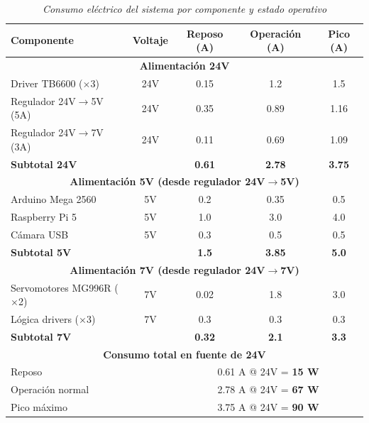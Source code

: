 \begin{table}[H]
\centering
\small
\begin{tabular}{|l|c|c|c|c|}
\hline
\textbf{Componente} & \textbf{Voltaje} & \textbf{Reposo (A)} & \textbf{Operación (A)} & \textbf{Pico (A)} \\
\hline
\multicolumn{5}{|c|}{\textbf{Alimentación 24V}} \\
\hline
Driver TB6600 ($\times$3) & 24V & 0.15 & 1.2 & 1.5 \\
\hline
Regulador 24V$\rightarrow$5V (5A)& 24V & 0.35 & 0.89 & 1.16 \\
\hline
Regulador 24V$\rightarrow$7V (3A)& 24V & 0.11 & 0.69 & 1.09 \\
\hline
\multicolumn{2}{|l|}{\textbf{Subtotal 24V}} & \textbf{0.61} & \textbf{2.78} & \textbf{3.75} \\
\hline
\hline
\multicolumn{5}{|c|}{\textbf{Alimentación 5V (desde regulador 24V$\rightarrow$5V)}} \\
\hline
Arduino Mega 2560 & 5V & 0.2 & 0.35 & 0.5 \\
\hline
Raspberry Pi 5 & 5V & 1.0 & 3.0 & 4.0 \\
\hline
Cámara USB & 5V & 0.3 & 0.5 & 0.5 \\
\hline
\multicolumn{2}{|l|}{\textbf{Subtotal 5V}} & \textbf{1.5} & \textbf{3.85} & \textbf{5.0} \\
\hline
\hline
\multicolumn{5}{|c|}{\textbf{Alimentación 7V (desde regulador 24V$\rightarrow$7V)}} \\
\hline
Servomotores MG996R ($\times$2) & 7V & 0.02 & 1.8 & 3.0 \\
\hline
Lógica drivers ($\times$3) & 7V & 0.3 & 0.3 & 0.3 \\
\hline
\multicolumn{2}{|l|}{\textbf{Subtotal 7V}} & \textbf{0.32} & \textbf{2.1} & \textbf{3.3} \\
\hline
\hline
\multicolumn{5}{|c|}{\textbf{Consumo total en fuente de 24V}} \\
\hline
\multicolumn{2}{|l|}{Reposo} & \multicolumn{3}{c|}{0.61 A @ 24V = \textbf{15 W}} \\
\hline
\multicolumn{2}{|l|}{Operación normal} & \multicolumn{3}{c|}{2.78 A @ 24V = \textbf{67 W}} \\
\hline
\multicolumn{2}{|l|}{Pico máximo} & \multicolumn{3}{c|}{3.75 A @ 24V = \textbf{90 W}} \\
\hline
\end{tabular}
\caption{\textit{Consumo eléctrico del sistema por componente y estado operativo}}
\label{tab:consumo_energetico_prototipo}
\end{table}

